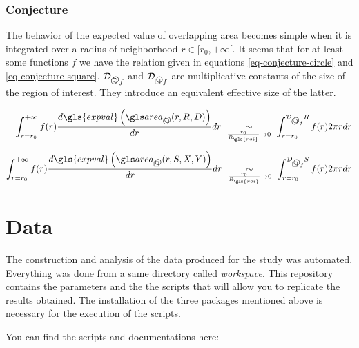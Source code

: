 \begin{appendix}

\subsubsection{Conjecture}

The behavior of the expected value of overlapping area becomes simple when it is integrated over a radius of neighborhood \( r \in [r_0, +\infty[\).
It seems that for at least some functions \( f \) we have the relation given in equations \eqref{eq-conjecture-circle} and \eqref{eq-conjecture-square}.
\( \mathcal{D}_{\symcirclecircle f} \) and \( \mathcal{D}_{\symcirclesquare f} \) are multiplicative constants of the size of the region of interest.
They introduce an equivalent effective size of the latter.

\begin{align}
  \int_{r=r_0}^{+\infty} f(r) \frac{d \gls{expval} \left( \circir (r, R, D) \right)}{dr} dr
    \ \underset{\frac{r_0}{R_{\gls{roi}}} \rightarrow 0}{\sim} \
    \int_{r=r_0}^{\mathcal{D}_{\symcirclecircle f} R} f(r) 2 \pi r dr
  \label{eq-conjecture-circle} \\[2mm]
  \int_{r=r_0}^{+\infty} f(r) \frac{d \gls{expval} \left( \cirsqr (r, S, X, Y) \right)}{dr} dr
    \ \underset{\frac{r_0}{R_{\gls{roi}}} \rightarrow 0}{\sim} \
    \int_{r=r_0}^{\mathcal{D}_{\symcirclesquare f} S} f(r) 2 \pi r dr
  \label{eq-conjecture-square}
\end{align}

\section{Data}\label{sec:data}

The construction and analysis of the data produced for the study was automated.
Everything was done from a same directory called \textit{workspace}.
This repository contains the parameters and the the scripts that will allow you to replicate the results obtained.
The installation of the three packages mentioned above is necessary for the execution of the scripts.

\bigskip

You can find the scripts and documentations here: 

\bigskip


\end{appendix}
